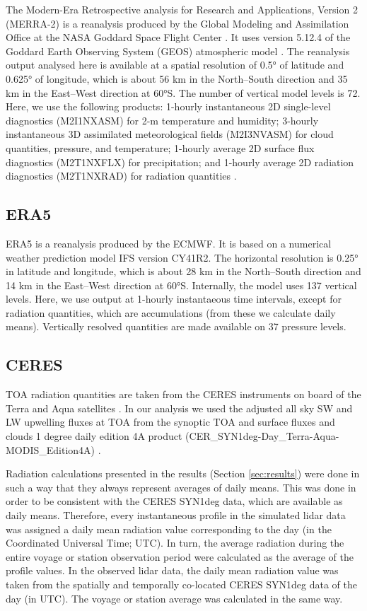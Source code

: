 \documentclass[12pt,a4paper]{article}
\begin{document}
The Modern-Era Retrospective analysis for Research and Applications, Version 2
(MERRA-2) is a reanalysis produced by the Global Modeling and Assimilation
Office at the NASA Goddard Space Flight Center \citep{gelaro2017}.  It uses
version 5.12.4 of the Goddard Earth Observing System (GEOS) atmospheric model
\citep{rienecker2008,molod2015}. The reanalysis output analysed here is
available at a spatial resolution of 0.5° of latitude and 0.625° of longitude,
which is about 56 km in the North--South direction and 35 km in the East--West
direction at 60°S. The number of vertical model levels is 72. Here, we use the
following products: 1-hourly instantaneous 2D single-level diagnostics
(M2I1NXASM) for 2-m temperature and humidity; 3-hourly instantaneous 3D
assimilated meteorological fields (M2I3NVASM) for cloud quantities, pressure,
and temperature; 1-hourly average 2D surface flux diagnostics (M2T1NXFLX) for
precipitation; and 1-hourly average 2D radiation diagnostics
(M2T1NXRAD) for radiation quantities \citep{merra2}.

\subsection{ERA5}

ERA5 \citep{era5} is a reanalysis produced by the ECMWF.  It is based on a
numerical weather prediction model IFS version CY41R2.  The horizontal
resolution is 0.25° in latitude and longitude, which is about 28 km in the
North--South direction and 14 km in the East--West direction at 60°S.
Internally, the model uses 137 vertical levels. Here, we use output at 1-hourly
instantaeous time intervals, except for radiation quantities, which are
accumulations (from these we calculate daily means).  Vertically resolved
quantities are made available on 37 pressure levels.

\subsection{CERES}

TOA radiation quantities are taken from the CERES instruments on board of the
Terra and Aqua satellites \citep{wielicki1996,loeb2018}. In our analysis we
used the adjusted all sky SW and LW upwelling fluxes at TOA from the synoptic
TOA and surface fluxes and clouds 1 degree daily edition 4A product
(CER\_SYN1deg-Day\_Terra-Aqua-MODIS\_Edition4A)
\citep{doelling2013,doelling2016}.

Radiation calculations presented in the results (Section \ref{sec:results})
were done in such a way that they always represent averages of daily means.
This was done in order to be consistent with the CERES SYN1deg data, which are
available as daily means. Therefore, every instantaneous profile in the
simulated lidar data was assigned a daily mean radiation value corresponding to
the day (in the Coordinated Universal Time; UTC). In turn, the average
radiation during the entire voyage or station observation period were
calculated as the average of the profile values. In the observed lidar data,
the daily mean radiation value was taken from the spatially and temporally
co-located CERES SYN1deg data of the day (in UTC). The voyage or station
average was calculated in the same way.
\end{document}
